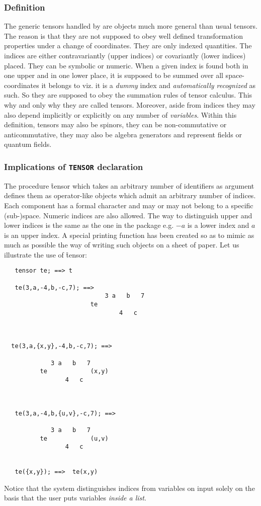 \subsubsection{Definition}
The generic tensors  handled by  are objects
much more general than usual tensors. The reason is that they are not supposed to
obey well defined transformation properties under a change of coordinates.
They are only indexed quantities. The indices are either
contravariantly (upper indices) or covariantly (lower indices) placed.
They can be symbolic or numeric. When a given index is found both
in one upper and in one lower place, it is supposed to be summed over
all space-coordinates it belongs to viz. it is a \emph{dummy}
index
and \emph{automatically recognized} as such.
So they are supposed to obey the summation rules of tensor calculus.
This why and only why they are called tensors. Moreover, aside from
indices they may also depend implicitly or explicitly on any number of
\emph{variables}. Within this definition,
tensors may also be spinors, they can be non-commutative or anticommutative,
they may also be algebra generators and represent fields or quantum fields.

\subsubsection{Implications of \texttt{TENSOR} declaration}
\hypertarget{command:TENSOR}{}

The procedure \f{tensor} which takes an arbitrary number of identifiers as argument
defines them as operator-like objects which admit an arbitrary number of indices.
Each component has a formal character and may or may not belong to a
specific (sub-)space. Numeric indices are also allowed. The way to distinguish
upper and lower indices is the same as the one in the package
 e.g. $-a$ is a lower index and $a$ is an
upper index.
A special printing function has been created so as to mimic as much as possible
the way of writing such objects on a sheet of paper.
Let us illustrate the use of \f{tensor}:
\begin{verbatim}
   tensor te; ==> t

   te(3,a,-4,b,-c,7); ==>
                            3 a   b   7
                        te
                                4   c



  te(3,a,{x,y},-4,b,-c,7); ==>

             3 a   b   7
          te            (x,y)
                 4   c



   te(3,a,-4,b,{u,v},-c,7); ==>

             3 a   b   7
          te            (u,v)
                 4   c


   te({x,y}); ==>  te(x,y)
\end{verbatim} 
Notice that the system distinguishes indices from variables on input
solely on the basis that the user puts variables \emph{inside a list}.

